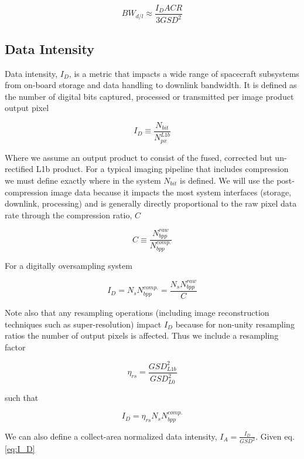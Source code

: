 \documentclass[10pt,journal]{IEEEtran}  %
\begin{document}
\begin{equation}
    BW_{d/l} \approx \frac{I_D ACR}{3 GSD^2}
\end{equation}

\subsection{Data Intensity}

Data intensity, $I_D$, is a metric that impacts a wide range of spacecraft subsystems from on-board storage and data handling to downlink bandwidth.  It is defined as the number of digital bits captured, processed or transmitted per image product output pixel

$$I_D \equiv \frac{N_{bit}}{N_{px}^{L1b}}$$

Where we assume an output product to consist of the fused, corrected but un-rectified L1b product. For a typical imaging pipeline that includes compression we must define exactly where in the system $N_{bit}$ is defined.  We will use the post-compression image data because it impacts the most system interfaces (storage, downlink, processing) and is generally directly proportional to the raw pixel data rate through the compression ratio, $C$

\begin{equation}
    \label{eq:compression}
    C \equiv \frac{N_{bpp}^{raw}}{N_{bpp}^{comp.}}
\end{equation}

For a digitally oversampling system

\begin{equation}
    I_D = N_s N_{bpp}^{comp.} = \frac{N_s N_{bpp}^{raw}}{C}
\end{equation}

Note also that any resampling operations (including image reconstruction techniques such as super-resolution) impact $I_D$ because for non-unity resampling ratios the number of output pixels is affected.  Thus we include a resampling factor

$${\eta}_{rs} = \frac{GSD_{L1b}^2}{GSD_{L0}^2}$$

such that

\begin{equation}
    \label{eq:I_D}
    I_D = {\eta}_{rs} N_s N_{bpp}^{comp.}
\end{equation}

We can also define a collect-area normalized data intensity, $I_A = \frac{I_{D}}{GSD^2}$.  Given eq. \ref{eq:I_D}
\end{document}
